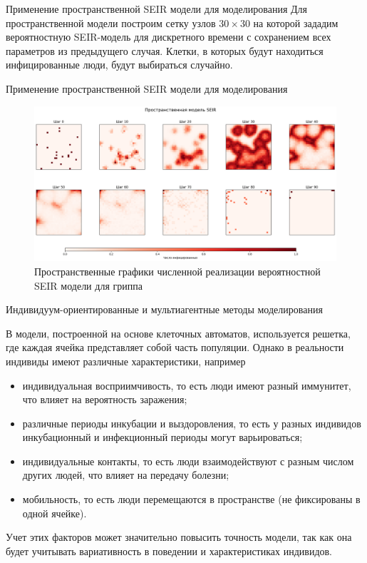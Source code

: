 \documentclass[notheorems]{beamer}
\begin{document}
\begin{frame}{Применение пространственной SEIR модели для моделирования}
	\small{Для пространственной модели построим сетку узлов $30 \times 30$ на которой зададим вероятностную SEIR-модель для дискретного времени с сохранением всех параметров из предыдущего случая. Клетки, в которых будут находиться инфицированные люди, будут выбираться случайно.}
	
	
\end{frame}


\begin{frame}
	
	{Применение пространственной SEIR модели для моделирования}
	\begin{figure}
		\centering
		\includegraphics[scale=0.3]{images/graph03}
		\caption{Пространственные графики численной реализации вероятностной SEIR модели для гриппа}
		\label{fig:graph03}
	\end{figure}
	
\end{frame}




\begin{frame}
	{Индивидуум-ориентированные и мультиагентные методы моделирования}
	\small{В модели, построенной на основе клеточных автоматов, используется решетка, где каждая ячейка представляет собой часть популяции. Однако в реальности индивиды имеют различные характеристики, например
	\begin{itemize}
		\item индивидуальная восприимчивость, то есть люди имеют разный иммунитет, что влияет на вероятность заражения;
		\item различные периоды инкубации и выздоровления, то есть у разных индивидов инкубационный и инфекционный периоды могут варьироваться;
		\item индивидуальные контакты, то есть люди взаимодействуют с разным числом других людей, что влияет на передачу болезни;
		\item мобильность, то есть люди перемещаются в пространстве (не фиксированы в одной ячейке).
	\end{itemize}
	
	Учет этих факторов может значительно повысить точность модели, так как она будет учитывать вариативность в поведении и характеристиках индивидов.}
\end{frame}
\end{document}
